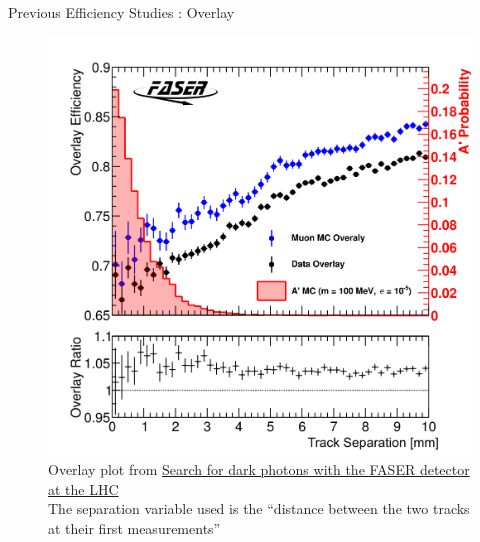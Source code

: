 \begin{frame}{Previous Efficiency Studies : Overlay}
	\begin{figure}
		\includegraphics[height=0.7 \textheight]{./assets/OverlayTracks.png}
        \caption{ Overlay plot from \href{https://cds.cern.ch/record/2864686/plots}{Search for dark photons with the FASER detector at the LHC}\\ The separation variable used is the ``distance between the two tracks at their first measurements''}
	\end{figure}
\end{frame}

